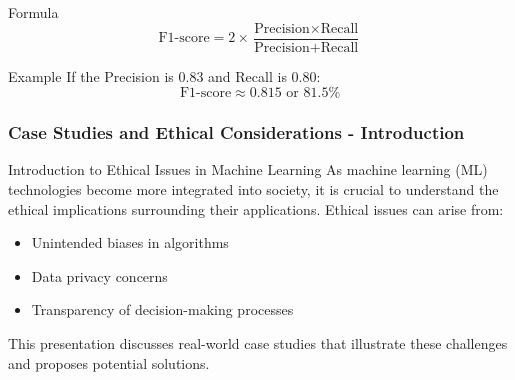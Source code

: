 \documentclass[aspectratio=169]{beamer}
\begin{document}
\begin{frame}[fragile]
    \begin{block}{Formula}
        \begin{equation}
            \text{F1-score} = 2 \times \frac{\text{Precision} \times \text{Recall}}{\text{Precision} + \text{Recall}} 
        \end{equation}
    \end{block}

    \begin{block}{Example}
        If the Precision is 0.83 and Recall is 0.80:
        \begin{equation}
            \text{F1-score} \approx 0.815 \text{ or } 81.5\%
        \end{equation}
    \end{block}
\end{frame}

\begin{frame}[fragile]
    \frametitle{Case Studies and Ethical Considerations - Introduction}
    \begin{block}{Introduction to Ethical Issues in Machine Learning}
        As machine learning (ML) technologies become more integrated into society, it is crucial to understand the ethical implications surrounding their applications. 
        Ethical issues can arise from:
        \begin{itemize}
            \item Unintended biases in algorithms
            \item Data privacy concerns
            \item Transparency of decision-making processes
        \end{itemize}
        This presentation discusses real-world case studies that illustrate these challenges and proposes potential solutions.
    \end{block}
\end{frame}
\end{document}
